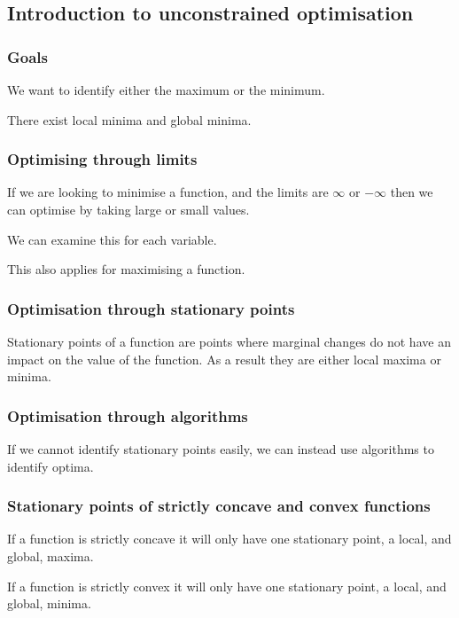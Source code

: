 
\subsection{Introduction to unconstrained optimisation}

\subsubsection{Goals}

We want to identify either the maximum or the minimum.

There exist local minima and global minima.

\subsubsection{Optimising through limits}

If we are looking to minimise a function, and the limits are \(\infty\) or \(-\infty\) then we can optimise by taking large or small values.

We can examine this for each variable.

This also applies for maximising a function.

\subsubsection{Optimisation through stationary points}

Stationary points of a function are points where marginal changes do not have an impact on the value of the function. As a result they are either local maxima or minima.

\subsubsection{Optimisation through algorithms}

If we cannot identify stationary points easily, we can instead use algorithms to identify optima.

\subsubsection{Stationary points of strictly concave and convex functions}

If a function is strictly concave it will only have one stationary point, a local, and global, maxima.

If a function is strictly convex it will only have one stationary point, a local, and global, minima.

